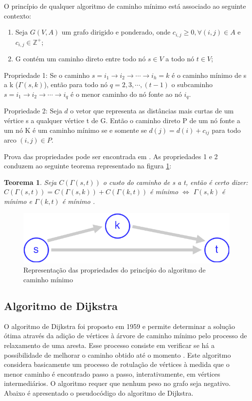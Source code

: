 O princípio de qualquer algoritmo de caminho mínimo está associado ao seguinte contexto:
\begin{enumerate}
  \item Seja $G(V,A)$ um grafo dirigido e ponderado, onde $c_{i,j} \geqslant 0, \forall (i,j) \in A$ e $c_{i,j} \in \mathbb{Z}^+$;
  \item G contém um caminho direto entre todo nó $s \in V$ a todo nó $t \in V$;
\end{enumerate}

Propriedade 1: Se o caminho $s=i_1 \rightarrow i_2 \rightarrow \cdots \rightarrow i_h = k$ é o caminho mínimo de s a k ($\Gamma(s,k)$),
então para todo nó $q = 2,3, \cdots, (t-1)$ o subcaminho $s=i_1 \rightarrow i_2 \rightarrow \cdots \rightarrow i_q$ é o menor caminho
do nó fonte ao nó $i_q$.

Propriedade 2: Seja $d$ o vetor que representa as distâncias mais curtas de um vértice s a qualquer vértice t de G. Então o caminho
direto P de um nó fonte a um nó K é um caminho mínimo se e somente se $d(j) = d(i) + c_{ij}$ para todo arco $(i,j) \in P$.

Prova das propriedades pode ser encontrada em \cite{bookahuja}. As propriedades 1 e 2 conduzem ao seguinte teorema representado na
figura \ref{fig:teorema}:

\newtheorem{meuteorema}{Teorema}[chapter]
\begin{meuteorema} \label{teo:Pita} 
Seja $C(\Gamma(s,t))$ o custo do caminho de s a t, então é certo dizer:
$C(\Gamma(s,t)) = C(\Gamma(s,k)) + C(\Gamma(k,t))$ é mínimo $\Longleftrightarrow$ $\Gamma(s,k)$ é mínimo e $\Gamma(k,t)$ é mínimo . 
\end{meuteorema}

\begin{figure}[htbp]
\centering
 \includegraphics[width=.45\textwidth]{chapters/fig/teorema.png}
\caption{Representação das propriedades do princípio do algoritmo de caminho mínimo}
\label{fig:teorema}
\end{figure}
\FloatBarrier

\subsection{Algoritmo de Dijkstra}
O algoritmo de Dijkstra foi proposto em 1959 e permite determinar a solução ótima através da adição de
vértices à árvore de caminho mínimo pelo processo de relaxamento de uma aresta. Esse processo consiste em verificar
se há a possibilidade de melhorar o caminho obtido até o momento \cite{boaventura}. Este algoritmo considera
basicamente um processo de rotulação de vértices à medida que o menor caminho é encontrado passo a passo,
interativamente, em vértices intermediários. O algoritmo requer que nenhum peso no grafo seja negativo. Abaixo
é apresentado o pseudocódigo do algoritmo de Dijkstra.

